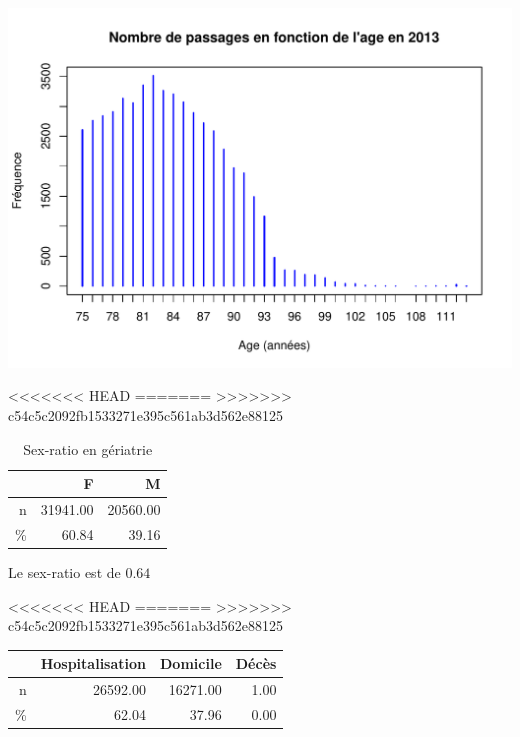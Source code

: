 \documentclass[12pt,english,french,twoside]{book}\usepackage[]{graphicx}\usepackage[]{color}
\makeatletter
\def\maxwidth{ %
  \ifdim\Gin@nat@width>\linewidth
    \linewidth
  \else
    \Gin@nat@width
  \fi
}
\newenvironment{knitrout}{}{} %
\makeatother
\begin{document}
\begin{knitrout}
\color{fgcolor}
\includegraphics[width=\maxwidth]{figure/passages_geriatrie} 

\end{knitrout}



<<<<<<< HEAD
=======
>>>>>>> c54c5c2092fb1533271e395c561ab3d562e88125
\begin{table}[ht]
\centering
\begin{tabular}{rrr}
  \hline
 & F & M \\ 
  \hline
n & 31941.00 & 20560.00 \\ 
  \% & 60.84 & 39.16 \\ 
   \hline
\end{tabular}
\caption[Sex-ratio en gériatrie]{Sex-ratio en gériatrie} 
\label{tab:ger_sr}
\end{table}




Le sex-ratio est de $0.64$


<<<<<<< HEAD
=======
>>>>>>> c54c5c2092fb1533271e395c561ab3d562e88125
\begin{table}[ht]
\centering
\begin{tabular}{rrrr}
  \hline
 & Hospitalisation & Domicile & Décès \\ 
  \hline
n & 26592.00 & 16271.00 & 1.00 \\ 
  \% & 62.04 & 37.96 & 0.00 \\ 
   \hline
\end{tabular}
\end{table}
\end{document}
